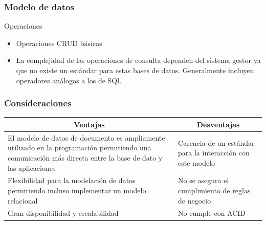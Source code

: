 \begin{frame}
    \frametitle{Modelo de datos}

    \begin{block}{Operaciones}
        \begin{itemize}
            \item Operaciones CRUD básicas
            \item La complejidad de las operaciones de consulta dependen del sistema gestor ya que no existe un estándar para
            estas bases de datos. Generalmente incluyen operadores análogos a los de SQl.
        \end{itemize}

    
    \end{block}

\end{frame}

\begin{frame}
    \frametitle{Consideraciones}

    \begin{table}[h!]
        \centering
        \begin{tabular}{|p{}|p{}|}
        \hline
        \multicolumn{1}{|c|}{\cellcolor{green1} \textbf{Ventajas}} &  \multicolumn{1}{|c|}{ \cellcolor{red1} \textbf{Desventajas}} \\ \hline
        El modelo de datos de documento es ampliamente utilizado en la programación permitiendo
        una comunicación más directa entre la base de dato y las aplicaciones & Carencia de un estándar para la interacción con este modelo \\ \hline
        Flexibilidad para la modelación de datos permitiendo incluso implementar un modelo relacional & No se asegura el cumplimiento de reglas de negocio \\ \hline
        Gran disponibilidad y escalabilidad & No cumple con ACID \\ \hline
        \end{tabular}
    \end{table}

\end{frame}


